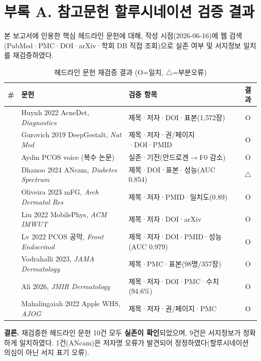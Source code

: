 \documentclass[11pt,a4paper]{article}
\begin{document}
\section*{부록 A. 참고문헌 할루시네이션 검증 결과}
\label{app:halluc}

본 보고서에 인용한 핵심 헤드라인 문헌에 대해, 작성 시점(2026-06-16)에 웹 검색(PubMed·PMC·DOI·arXiv·학회 DB 직접 조회)으로 실존 여부 및 서지정보 일치를 재검증하였다.

\begin{table}[h]
\centering
\footnotesize
\renewcommand{\arraystretch}{1.2}
\caption{헤드라인 문헌 재검증 결과 (O=일치, $\triangle$=부분오류)}
\begin{tabularx}{\textwidth}{@{}c L p{4.2cm} c@{}}
\toprule
\textbf{\#} & \textbf{문헌} & \textbf{검증 항목} & \textbf{결과} \\
\midrule
\cite{ref1} & Huynh 2022 AcneDet, \emph{Diagnostics} & 제목·저자·DOI·표본(1{,}572장) & O \\
\cite{ref2} & Gurovich 2019 DeepGestalt, \emph{Nat Med} & 제목·저자·권/페이지·DOI·PMID & O \\
\cite{ref4} & Aydin PCOS voice (복수 논문) & 실존·기전(안드로겐$\rightarrow$F0 감소) & O \\
\cite{ref5} & Dhanoo 2024 ANcam, \emph{Diabetes Spectrum} & 제목·DOI·표본·성능(AUC 0.854) & $\triangle$ \\
\cite{ref6} & Oliveira 2023 mFG, \emph{Arch Dermatol Res} & 제목·저자·PMID·일치도(0.89) & O \\
\cite{ref7} & Liu 2022 MobilePhys, \emph{ACM IMWUT} & 제목·저자·DOI·arXiv & O \\
\cite{ref10} & Lv 2022 PCOS 공막, \emph{Front Endocrinol} & 제목·저자·DOI·PMID·성능(AUC 0.979) & O \\
\cite{ref11} & Vodrahalli 2023, \emph{JAMA Dermatology} & 제목·PMC·표본(98명/357장) & O \\
\cite{ref12} & Ali 2026, \emph{JMIR Dermatology} & 제목·저자·DOI·PMC·수치(94.6\%) & O \\
\cite{ref13} & Mahalingaiah 2022 Apple WHS, \emph{AJOG} & 제목·저자·권/페이지·PMC & O \\
\bottomrule
\end{tabularx}
\end{table}

\textbf{결론.} 재검증한 헤드라인 문헌 10건 모두 \textbf{실존이 확인}되었으며, 9건은 서지정보가 정확하게 일치하였다. 1건(ANcam)은 저자명 오류가 발견되어 정정하였다(할루시네이션 의심이 아닌 서지 표기 오류).
\end{document}
